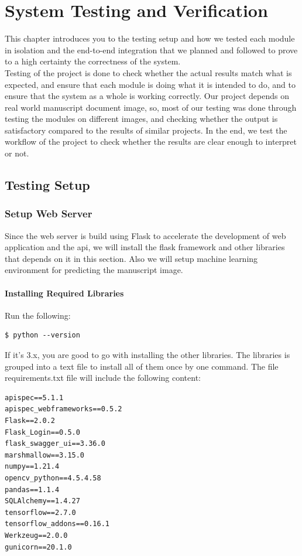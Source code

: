 \chapter{System Testing and Verification}
\label{ch:system-testing}

This chapter introduces you to the testing setup and how we tested each module in isolation and the end-to-end integration that we planned and followed to prove to a high certainty the correctness of the system. \\

Testing of the project is done to check whether the actual results match what is expected, and ensure that each module is doing what it is intended to do, and to ensure that the system as a whole is working correctly. Our project depends on real world manuscript document image, so, most of our testing was done through testing the modules on different images, and checking whether the output is satisfactory compared to the results of similar projects. In the end, we test the workflow of the project to check whether the results are clear enough to interpret or not.

\section{Testing Setup}
\subsection{Setup Web Server}
Since the web server is build using Flask to accelerate the development of web application and the \acrfull{api}, we will install the flask framework and other libraries that depends on it in this section. Also we will setup machine learning environment for predicting the manuscript image.

\subsubsection{Installing Required Libraries}
Run the following:
\begin{verbatim}
$ python --version
\end{verbatim}
If it's 3.x, you are good to go with installing the other libraries. The libraries is grouped into a text file to install all of them once by one command. The file requirements.txt file will include the following content:

\begin{verbatim}
apispec==5.1.1
apispec_webframeworks==0.5.2
Flask==2.0.2
Flask_Login==0.5.0
flask_swagger_ui==3.36.0
marshmallow==3.15.0
numpy==1.21.4
opencv_python==4.5.4.58
pandas==1.1.4
SQLAlchemy==1.4.27
tensorflow==2.7.0
tensorflow_addons==0.16.1
Werkzeug==2.0.0
gunicorn==20.1.0
\end{verbatim}


